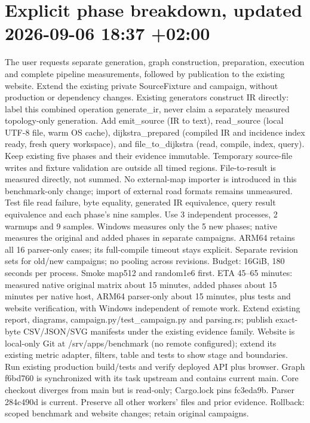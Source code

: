 \documentclass{article}
\begin{document}
\section*{Explicit phase breakdown, updated 2026-09-06 18:37 +02:00}
The user requests separate generation, graph construction, preparation, execution
and complete pipeline measurements, followed by publication to the existing website.
Extend the existing private SourceFixture and campaign, without production or
dependency changes. Existing generators construct IR directly: label this combined
operation generate\_ir, never claim a separately measured topology-only generation.
Add emit\_source (IR to text), read\_source (local UTF-8 file, warm OS cache),
dijkstra\_prepared (compiled IR and incidence index ready, fresh query workspace),
and file\_to\_dijkstra (read, compile, index, query). Keep existing five phases
and their evidence immutable. Temporary source-file writes and fixture validation
are outside all timed regions. File-to-result is measured directly, not summed.
No external-map importer is introduced in this benchmark-only change; import of
external road formats remains unmeasured. Test file read failure, byte equality,
generated IR equivalence, query result equivalence and each phase's nine samples.
Use 3 independent processes, 2 warmups and 9 samples. Windows measures only the
5 new phases; native measures the original and added phases in separate campaigns.
ARM64 retains all 16 parser-only cases; its full-compile timeout stays explicit.
Separate revision sets for old/new campaigns; no pooling across revisions.
Budget: 16GiB, 180 seconds per process. Smoke map512 and random1e6 first.
ETA 45--65 minutes: measured native original matrix about 15 minutes, added
phases about 15 minutes per native host, ARM64 parser-only about 15 minutes,
plus tests and website verification, with Windows independent of remote work.
Extend existing report, diagrams, campaign.py/test\_campaign.py and parsing.rs;
publish exact-byte CSV/JSON/SVG manifests under the existing evidence family.
Website is local-only Git at /srv/apps/benchmark (no remote configured); extend
its existing metric adapter, filters, table and tests to show stage and boundaries.
Run existing production build/tests and verify deployed API plus browser.
Graph f6bd760 is synchronized with its task upstream and contains current main.
Core checkout diverges from main but is read-only; Cargo.lock pins fc3eda9b.
Parser 284c490d is current. Preserve all other workers' files and prior evidence.
Rollback: scoped benchmark and website changes; retain original campaigns.
\end{document}
